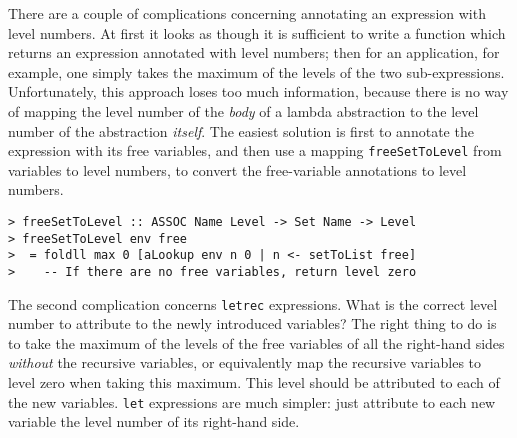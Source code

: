 There are a couple of complications concerning annotating an expression
with level numbers.
At first it looks as though it is sufficient to write a function which
returns an expression annotated with level numbers; then for an
application, for example, one simply takes the maximum of the levels
of the two sub-expressions.  Unfortunately, this approach loses too
much information, because there is no way of mapping the level number
of the {\em body\/} of a lambda abstraction to the level number of the
abstraction {\em itself}.  The easiest solution is first to annotate
the expression with its free variables, and then use a mapping
\mbox{\tt freeSetToLevel} from variables to level numbers, to convert the
free-variable annotations to level numbers.
\begin{verbatim}
> freeSetToLevel :: ASSOC Name Level -> Set Name -> Level
> freeSetToLevel env free
>  = foldll max 0 [aLookup env n 0 | n <- setToList free]
>    -- If there are no free variables, return level zero
\end{verbatim}
%
%
\par
The second complication concerns \mbox{\tt letrec} expressions.  What is the
correct level number to attribute to the newly introduced variables?
The right thing to do is to take the maximum of the levels of the free
variables of all the right-hand sides {\em without\/} the recursive
variables, or equivalently map the recursive variables to level zero
when taking this maximum.  This level should be attributed to each of
the new variables.  \mbox{\tt let} expressions are much simpler: just attribute
to each new variable the level number of its right-hand side.

